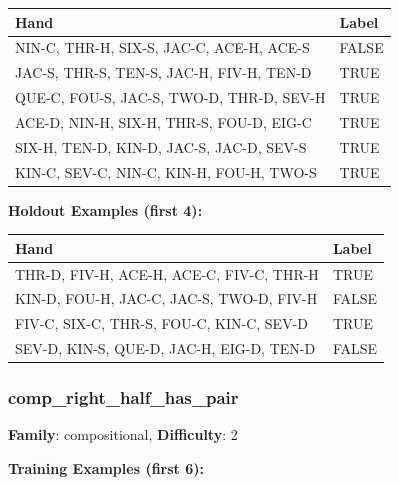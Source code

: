 \documentclass[10pt,a4paper]{article}
\begin{document}
\begin{small}
\begin{tabular}{p{8cm}l}
\toprule
Hand & Label \\
\midrule
NIN-C, THR-H, SIX-S, JAC-C, ACE-H, ACE-S & \textcolor{negative}{FALSE} \\
JAC-S, THR-S, TEN-S, JAC-H, FIV-H, TEN-D & \textcolor{positive}{TRUE} \\
QUE-C, FOU-S, JAC-S, TWO-D, THR-D, SEV-H & \textcolor{positive}{TRUE} \\
ACE-D, NIN-H, SIX-H, THR-S, FOU-D, EIG-C & \textcolor{positive}{TRUE} \\
SIX-H, TEN-D, KIN-D, JAC-S, JAC-D, SEV-S & \textcolor{positive}{TRUE} \\
KIN-C, SEV-C, NIN-C, KIN-H, FOU-H, TWO-S & \textcolor{positive}{TRUE} \\
\bottomrule
\end{tabular}
\end{small}

\textbf{Holdout Examples (first 4):}

\begin{small}
\begin{tabular}{p{8cm}l}
\toprule
Hand & Label \\
\midrule
THR-D, FIV-H, ACE-H, ACE-C, FIV-C, THR-H & \textcolor{positive}{TRUE} \\
KIN-D, FOU-H, JAC-C, JAC-S, TWO-D, FIV-H & \textcolor{negative}{FALSE} \\
FIV-C, SIX-C, THR-S, FOU-C, KIN-C, SEV-D & \textcolor{positive}{TRUE} \\
SEV-D, KIN-S, QUE-D, JAC-H, EIG-D, TEN-D & \textcolor{negative}{FALSE} \\
\bottomrule
\end{tabular}
\end{small}

\vspace{0.5cm}

\subsubsection{comp\_right\_half\_has\_pair}

\textbf{Family}: compositional, \textbf{Difficulty}: 2

\textbf{Training Examples (first 6):}
\end{document}
